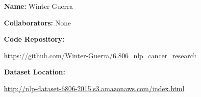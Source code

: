 \documentclass[12pt,twoside]{article}
\title{}
\begin{document}

\medskip

\hrulefill

\medskip
{\bf Name:} Winter Guerra
\medskip

{\bf Collaborators:} None

\medskip

{\bf Code Repository:} 

\url{https://github.com/Winter-Guerra/6.806_nlp_cancer_research}

\medskip

{\bf Dataset Location:} 

\url{http://nlp-dataset-6806-2015.s3.amazonaws.com/index.html}

\hrulefill







\end{document}
